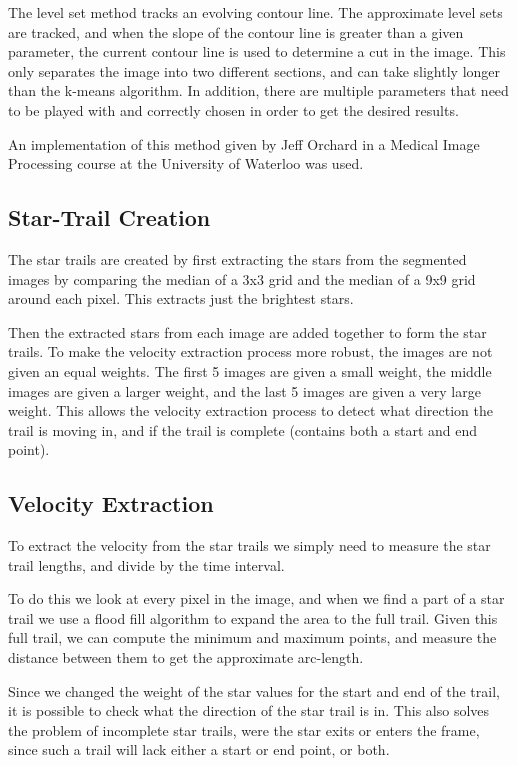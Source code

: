 \documentclass[onecolumn,preprintnumbers,amsmath,amssymb]{revtex4}
\begin{document}
The level set method tracks an evolving contour line.  The approximate level sets are tracked, and when the slope of the contour line is greater than a given parameter, the current contour line is used to determine a cut in the image.  This only separates the image into two different sections, and can take slightly longer than the k-means algorithm.  In addition, there are multiple parameters that need to be played with and correctly chosen in order to get the desired results.

An implementation of this method given by Jeff Orchard in a Medical Image Processing course at the University of Waterloo was used. 

\subsection{ \bf Star-Trail Creation }

The star trails are created by first extracting the stars from the segmented images by comparing the median of a 3x3 grid and the median of a 9x9 grid around each pixel.  This extracts just the brightest stars.

Then the extracted stars from each image are added together to form the star trails.  To make the velocity extraction process more robust, the images are not given an equal weights.  The first 5 images are given a small weight, the middle images are given a larger weight, and the last 5 images are given a very large weight.  This allows the velocity extraction process to detect what direction the trail is moving in, and if the trail is complete (contains both a start and end point). 

\subsection{ \bf Velocity Extraction }

To extract the velocity from the star trails we simply need to measure the star trail lengths, and divide by the time interval. 

To do this we look at every pixel in the image, and when we find a part of a star trail we use a flood fill algorithm to expand the area to the full trail.  Given this full trail, we can compute the minimum and maximum points, and measure the distance between them to get the approximate arc-length.  

Since we changed the weight of the star values for the start and end of the trail, it is possible to check what the direction of the star trail is in.  This also solves the problem of incomplete star trails, were the star exits or enters the frame, since such a trail will lack either a start or end point, or both. 
\end{document}
